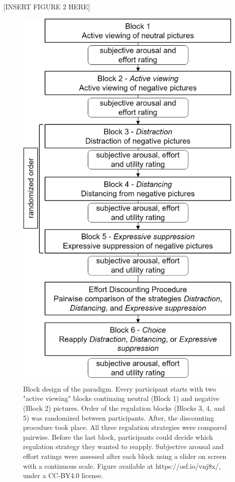 \documentclass[
  man,floatsintext]{apa6}
\begin{document}
{[}INSERT FIGURE 2 HERE{]}

\begin{figure}
\includegraphics[width=\textwidth]{figures/Design_ER-ED} \caption{Block design of the paradigm. Every participant starts with two "active viewing" blocks continaing neutral (Block 1) and negative (Block 2) pictures. Order of the regulation blocks (Blocks 3, 4, and 5) was randomized between participants. After, the discounting procedure took place. All three regulation strategies were compared pairwise. Before the last block, participants could decide which regulation strategy they wanted to reapply. Subjective arousal and effort ratings were assessed after each block using a slider on screen with a continuous scale. Figure available at https://osf.io/vnj8x/, under a CC-BY4.0 license.}\label{fig:DesignERED}
\end{figure}
\end{document}
